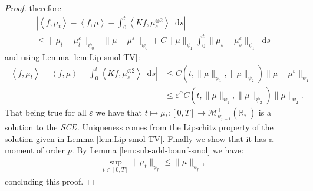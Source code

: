 \documentclass[11pt,a4paper]{article}
\newcommand{\RRP}{\mathbb{R}^+_*}
\newcommand{\MC}{\mathcal{M}}
\newcommand{\SCE}{\emph{SCE}}
\newcommand{\brac}[1]{\left\langle#1\right\rangle}
\newcommand{\dd}{\mathop{}\!\mathrm{d}}
\begin{document}
\begin{proof}
    therefore
    \begin{multline*}
        \left|\brac{f,\mu_t} - \brac{f,\mu} - \int_0^t\brac{Kf,\mu_s^{\otimes 2}}\dd s\right|\\
        \leq \|\mu_t - \mu_t^\varepsilon\|_{\psi_0} + \|\mu - \mu^\varepsilon\|_{\psi_0} + C\|\mu\|_{\psi_1}\int_0^t \| \mu_s - \mu^\varepsilon_s \|_{\psi_1} \dd s
    \end{multline*}
    and using Lemma \ref{lem:Lip-smol-TV}:
    \begin{align*}
        \left|\brac{f,\mu_t} - \brac{f,\mu} - \int_0^t\brac{Kf,\mu_s^{\otimes 2}}\dd s\right| &\leq C(t,\|\mu\|_{\psi_1},\|\mu\|_{\psi_2})\|\mu - \mu^\varepsilon\|_{\psi_1} \\
        &\leq \varepsilon^{\alpha} C(t,\|\mu\|_{\psi_1},\|\mu\|_{\psi_2})\|\mu\|_{\psi_2}.
    \end{align*}
    That being true for all $\varepsilon$ we have that $t \mapsto \mu_t : [0,T] \to \MC_{\psi_{p-1}}^+(\RRP)$ is a solution to the $\SCE$. Uniqueness comes from the Lipschitz property of the solution given in Lemma \ref{lem:Lip-smol-TV}. Finally we show that it has a moment of order $p$. By Lemma \ref{lem:sub-add-bounf-smol} we have:
    \begin{align*}
        \sup\limits_{t \in [0,T]} \| \mu_t\|_{\psi_{p}} \leq  \| \mu\|_{\psi_{p}},
    \end{align*}
    concluding this proof.
\end{proof}
\end{document}
